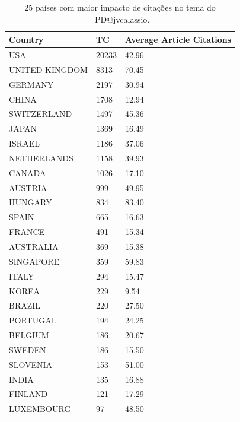 \begin{table}[htp]
    \centering
    \footnotesize
    \begin{tabular}{|l|l|l|}
    \hline
        Country & TC & Average Article Citations \\ \hline
        USA & 20233 & 42.96 \\ \hline
        UNITED KINGDOM & 8313 & 70.45 \\ \hline
        GERMANY & 2197 & 30.94 \\ \hline
        CHINA & 1708 & 12.94 \\ \hline
        SWITZERLAND & 1497 & 45.36 \\ \hline
        JAPAN & 1369 & 16.49 \\ \hline
        ISRAEL & 1186 & 37.06 \\ \hline
        NETHERLANDS & 1158 & 39.93 \\ \hline
        CANADA & 1026 & 17.10 \\ \hline
        AUSTRIA & 999 & 49.95 \\ \hline
        HUNGARY & 834 & 83.40 \\ \hline
        SPAIN & 665 & 16.63 \\ \hline
        FRANCE & 491 & 15.34 \\ \hline
        AUSTRALIA & 369 & 15.38 \\ \hline
        SINGAPORE & 359 & 59.83 \\ \hline
        ITALY & 294 & 15.47 \\ \hline
        KOREA & 229 & 9.54 \\ \hline
        BRAZIL & 220 & 27.50 \\ \hline
        PORTUGAL & 194 & 24.25 \\ \hline
        BELGIUM & 186 & 20.67 \\ \hline
        SWEDEN & 186 & 15.50 \\ \hline
        SLOVENIA & 153 & 51.00 \\ \hline
        INDIA & 135 & 16.88 \\ \hline
        FINLAND & 121 & 17.29 \\ \hline
        LUXEMBOURG & 97 & 48.50 \\ \hline
    \end{tabular}
    \caption{25 países com maior impacto de citações no tema do \dataset\ PD@jvcalassio.}
    \label{tab:PD@jvcalassio:Most-Cited-Countries}
\end{table}

